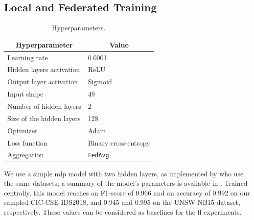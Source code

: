 \subsection{Local and Federated Training\label{sec:assess.method.models}}

\begin{table}
  \newcommand{\cellcenter}[1]{\multicolumn{1}{c}{#1}}
  \centering
  \caption{Hyperparameters.\label{tbl:hyperparams}}
  \small
  \begin{tabular}{ll}
    \toprule %
    \cellcenter{\textbf{Hyperparameter}}   & \cellcenter{\textbf{Value}} \\
    \midrule %
    Learning rate             & 0.0001 \\
    Hidden layers activation  & ReLU \\
    Output layer activation   & Sigmoid \\
    Input shape               & 49 \\
    Number of hidden layers   & 2 \\ 
    Size of the hidden layers & 128 \\
    Optimizer                 & Adam \\
    Loss function             & Binary cross-entropy \\
    Aggregation               & \texttt{FedAvg} \\
    \bottomrule %
  \end{tabular}
\end{table}

We use a simple \gls{mlp} model with two hidden layers, as implemented by \textcite{popoola_FederatedDeepLearning_2021} who use the same datasets; a summary of the model's parameters is available in .
Trained centrally, this model reaches an F1-score of 0.966 and an accuracy of 0.992 on our sampled CIC-CSE-IDS2018, and 0.945 and 0.995 on the UNSW-NB15 dataset, respectively.
These values can be considered as baselines for the \gls{fl} experiments.

